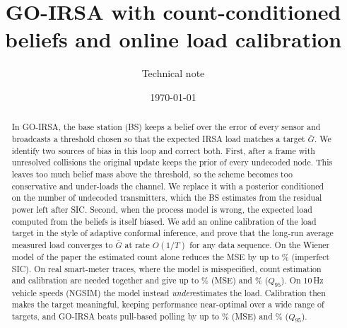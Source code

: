 \documentclass[10pt]{article}
\title{GO-IRSA with count-conditioned beliefs and online load calibration}
\author{Technical note}
\date{\today}
\theoremstyle{remark}
\theoremstyle{definition}
\newcommand{\Gb}{\bar G}
\begin{document}
\maketitle

\begin{abstract}
In GO-IRSA, the base station (BS) keeps a belief over the error of every sensor and
broadcasts a threshold chosen so that the expected IRSA load matches a target
$\Gb$. We identify two sources of bias in this loop and correct both. First, after a
frame with unresolved collisions the original update keeps the prior of every undecoded
node. This leaves too much belief mass above the threshold, so the scheme becomes too
conservative and under-loads the channel. We replace it with a posterior conditioned on the
number of undecoded transmitters, which the BS estimates from the residual power left
after SIC. Second, when the process model is wrong, the expected load computed from the
beliefs is itself biased. We add an online calibration of the load target in the style of
adaptive conformal inference, and prove that the long-run average measured load converges to
$\Gb$ at rate $O(1/T)$ for any data sequence. On the Wiener model of the paper the estimated
count alone reduces the MSE by up to \synGainMaxImperfect\% (imperfect SIC). On real
smart-meter traces, where the model is misspecified, count estimation and calibration are
needed together and give up to \realGainEstcMax\% (MSE) and \realGainQEstcMax\% ($Q_{95}$).
On 10\,Hz vehicle speeds (NGSIM) the model instead \emph{under}estimates the load. Calibration then
makes the target meaningful, keeping performance near-optimal over a wide range of targets, and
GO-IRSA beats pull-based polling by up to \ngVsPullMseMax\% (MSE) and \ngVsPullQMax\% ($Q_{95}$).
\end{abstract}

\end{document}
